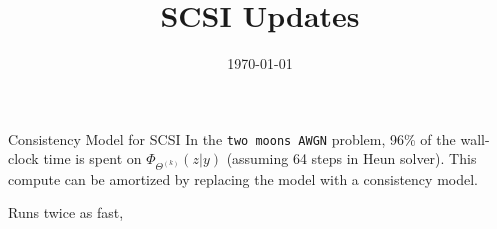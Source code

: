 \documentclass[aspectratio=169]{beamer}
\title{SCSI Updates}
\date{\today}
\begin{document}
\begin{frame}
  \titlepage
\end{frame}

\begin{frame}
    {Consistency Model for SCSI}
    In the \texttt{two moons AWGN} problem, 96\% of the wall-clock time is spent on $\Phi_{\Theta^{(k)}}(z | y)$ (assuming 64 steps in Heun solver). This compute can be  amortized by replacing the model with a consistency model.

    Runs twice as fast,
\end{frame}
\end{document}
